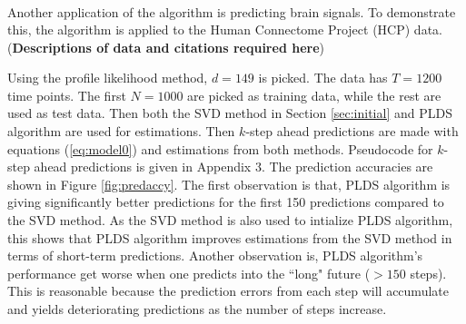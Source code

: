 \documentclass[fleqn]{article}
\let\oldref\ref
\renewcommand{\ref}[1]{(\oldref{#1})}
\begin{document}
\begin{center}
\[\begin{array}{lll}
\end{array}
\]
\label{fig:3d}
\end{center}

Another application of the algorithm is predicting brain signals. To demonstrate this, the algorithm is applied to the Human Connectome Project (HCP) data. (\textbf{Descriptions of data and citations required here})

Using the profile likelihood method, $d=149$ is picked. The data has $T=1200$ time points. The first $N = 1000$ are picked as training data, while the rest are used as test data. Then both the SVD method in Section \oldref{sec:initial} and PLDS algorithm are used for estimations. Then $k$-step ahead predictions are made with equations \ref{eq:model0} and estimations from both methods. Pseudocode for $k$-step ahead predictions is given in Appendix 3. The prediction accuracies are shown in Figure \oldref{fig:predaccy}. The first observation is that, PLDS algorithm is giving significantly better predictions for the first 150 predictions compared to the SVD method. As the SVD method is also used to intialize PLDS algorithm, this shows that PLDS algorithm improves estimations from the SVD method in terms of short-term predictions. Another observation is, PLDS algorithm's performance get worse when one predicts into the ``long" future ($>150$ steps). This is reasonable because the prediction errors from each step will accumulate and yields deteriorating predictions as the number of steps increase.
\end{document}
